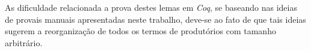 As dificuldade relacionada a prova destes lemas em \textit{Coq}, se baseando nas ideias de provais manuais apresentadas neste trabalho, deve-se ao fato de que tais ideias sugerem a reorganização de todos os termos de produtórios com tamanho arbitrário.   


